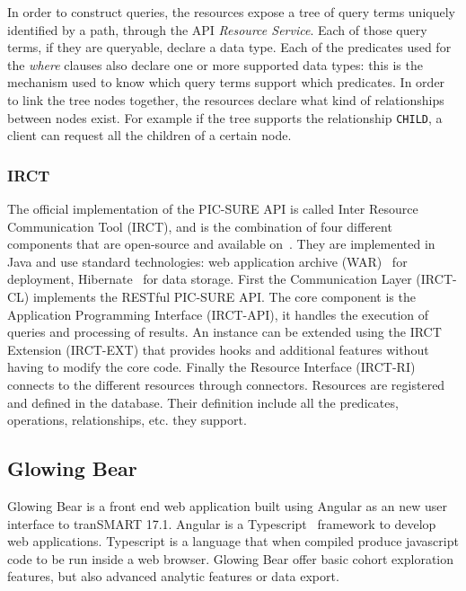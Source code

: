 In order to construct queries, the resources expose a tree of query terms uniquely identified by a path, through the API \emph{Resource Service}.
Each of those query terms, if they are queryable, declare a data type.
Each of the predicates used for the \emph{where} clauses also declare one or more supported data types: this is the mechanism used to know which query terms support which predicates.
In order to link the tree nodes together, the resources declare what kind of relationships between nodes exist.
For example if the tree supports the relationship \verb|CHILD|, a client can request all the children of a certain node. 


\subsubsection*{IRCT}

The official implementation of the PIC-SURE API is called Inter Resource Communication Tool (IRCT), and is the combination of four different components that are open-source and available on~\cite{IRCT-github}. 
They are implemented in Java and use standard technologies: web application archive (WAR)~\cite{wiki:war} for deployment, Hibernate~\cite{wiki:hibernate} for data storage.
First the Communication Layer (IRCT-CL) implements the RESTful PIC-SURE API. 
The core component is the Application Programming Interface (IRCT-API), it handles the execution of queries and processing of results.
An instance can be extended using the IRCT Extension (IRCT-EXT) that provides hooks and additional features without having to modify the core code.
Finally the Resource Interface (IRCT-RI) connects to the different resources through connectors.
Resources are registered and defined in the database.
Their definition include all the predicates, operations, relationships, etc. they support.


\subsection{Glowing Bear}

Glowing Bear is a front end web application built using Angular as an new user interface to tranSMART 17.1.
Angular is a Typescript~\cite{todo} framework to develop web applications.
Typescript is a language that when compiled produce javascript code to be run inside a web browser.
Glowing Bear offer basic cohort exploration features, but also advanced analytic features or data export.

